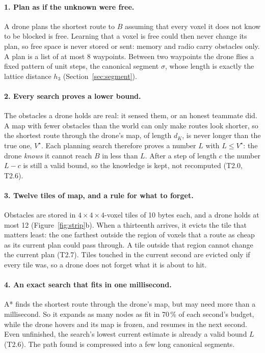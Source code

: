 \documentclass[11pt,a4paper]{article}
\newcommand{\Vs}{V^\star}
\begin{document}
\paragraph{1. Plan as if the unknown were free.} A drone plans the shortest route to $B$ assuming that every voxel it
does not know to be blocked is free. Learning that a voxel is free could then never change its plan, so free space is
never stored or sent: memory and radio carry obstacles only. A plan is a list of at most 8 waypoints. Between two
waypoints the drone flies a fixed pattern of unit steps, the canonical segment $\sigma$, whose length is exactly the
lattice distance $h_3$ (Section~\ref{sec:segment}).

\paragraph{2. Every search proves a lower bound.} The obstacles a drone holds are real: it sensed them, or an honest
teammate did. A map with fewer obstacles than the world can only make routes look shorter, so the shortest route
through the drone's map, of length $d_K$, is never longer than the true one, $\Vs$. Each planning search therefore
proves a number $L$ with $L\le\Vs$: the drone \emph{knows} it cannot reach $B$ in less than $L$. After a step of
length $c$ the number $L-c$ is still a valid bound, so the knowledge is kept, not recomputed (T2.0, T2.6).

\paragraph{3. Twelve tiles of map, and a rule for what to forget.} Obstacles are stored in $4\times4\times4$-voxel tiles
of 10 bytes each, and a drone holds at most 12 (Figure~\ref{fig:strip}b). When a thirteenth arrives, it evicts the
tile that matters least: the one farthest outside the region of voxels that a route as cheap as its current plan
could pass through. A tile outside that region cannot change the current plan (T2.7). Tiles touched in the current
second are evicted only if every tile was, so a drone does not forget what it is about to hit.

\paragraph{4. An exact search that fits in one millisecond.} A* finds the shortest route through the drone's map, but
may need more than a millisecond. So it expands as many nodes as fit in 70\,\% of each second's budget, while the drone
hovers and its map is frozen, and resumes in the next second. Even unfinished, the search's lowest current estimate is
already a valid bound $L$ (T2.6). The path found is compressed into a few long canonical segments.
\end{document}
